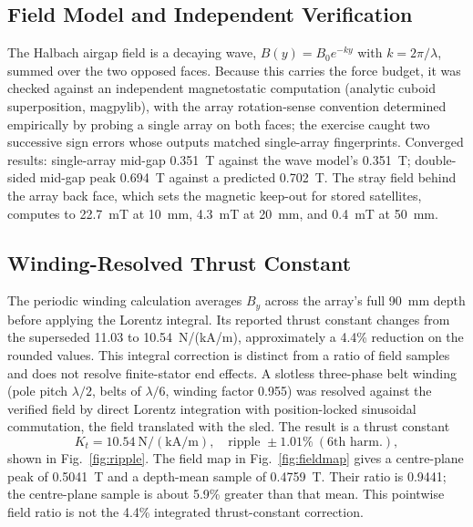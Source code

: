 \documentclass[conference]{IEEEtran}
\begin{document}
\subsection{Field Model and Independent Verification}
The Halbach airgap field is a decaying wave, $B(y)=B_0e^{-ky}$ with $k=2\pi/\lambda$, summed over the two opposed faces. Because this carries the force budget, it was checked against an independent magnetostatic computation (analytic cuboid superposition, magpylib), with the array rotation-sense convention determined empirically by probing a single array on both faces; the exercise caught two successive sign errors whose outputs matched single-array fingerprints. Converged results: single-array mid-gap 0.351~T against the wave model's 0.351~T; double-sided mid-gap peak 0.694~T against a predicted 0.702~T. The stray field behind the array back face, which sets the magnetic keep-out for stored satellites, computes to 22.7~mT at 10~mm, 4.3~mT at 20~mm, and 0.4~mT at 50~mm.

\subsection{Winding-Resolved Thrust Constant}
The periodic winding calculation averages $B_y$ across the array's full 90~mm depth before applying the Lorentz integral. Its reported thrust constant changes from the superseded 11.03 to 10.54~N/(kA/m), approximately a 4.4\% reduction on the rounded values. This integral correction is distinct from a ratio of field samples and does not resolve finite-stator end effects.
A slotless three-phase belt winding (pole pitch $\lambda/2$, belts of $\lambda/6$, winding factor 0.955) was resolved against the verified field by direct Lorentz integration with position-locked sinusoidal commutation, the field translated with the sled. The result is a thrust constant
\begin{equation}
K_t = 10.54~\mathrm{N/(kA/m)},\quad \text{ripple } \pm1.01\%\ (6\text{th harm.}),
\end{equation}
shown in Fig.~\ref{fig:ripple}. The field map in Fig.~\ref{fig:fieldmap} gives a centre-plane peak of 0.5041~T and a depth-mean sample of 0.4759~T. Their ratio is 0.9441; the centre-plane sample is about 5.9\% greater than that mean. This pointwise field ratio is not the 4.4\% integrated thrust-constant correction.
\end{document}
